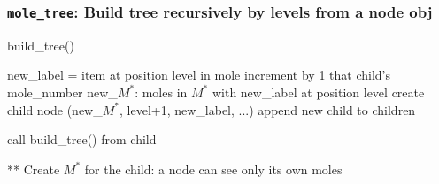 \documentclass{beamer}
\begin{document}

\begin{frame}[fragile]
\frametitle{\texttt{mole\_tree}: Build tree recursively by levels from a node obj}
\begin{algorithm}[H]
\caption{build\_tree()}\label{alg:cap}
\begin{algorithmic}
      
        \State new\_label = item at position level in mole
          
            \State increment by 1 that child's mole\_number
        \Else  {}
            \State new\_$M^{*}$: moles in $M^{*}$ with new\_label at position level  \Comment{**}
            \State create child node (new\_$M^{*}$, level+1, new\_label, ...)
            \State append new child to children
\end{algorithmic}
\begin{algorithmic}
  
    \State call build\_tree() from child
\end{algorithmic}
\end{algorithm}

** Create $M^{*}$ for the child\*\*: a node can see only its own moles
\end{frame}
\end{document}
